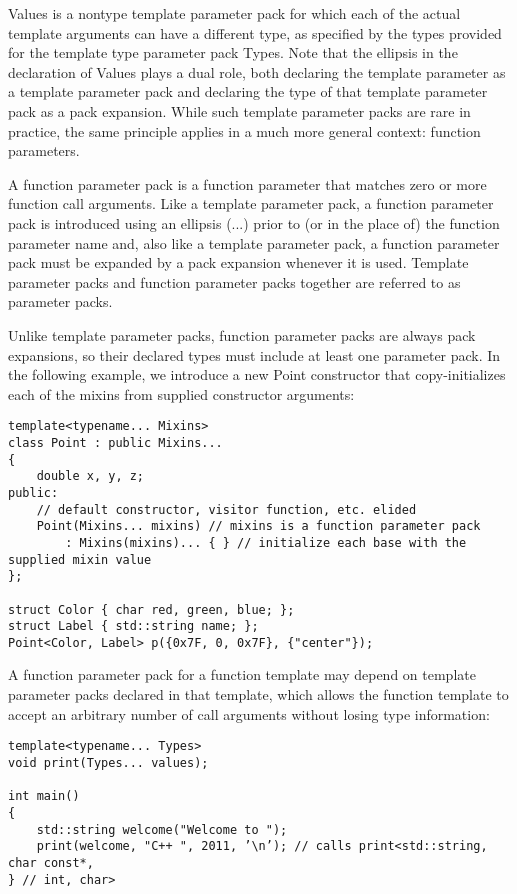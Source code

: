 Values is a nontype template parameter pack for which each of the actual template arguments can have a different type, as specified by the types provided for the template type parameter pack Types. Note that the ellipsis in the declaration of Values plays a dual role, both declaring the template parameter as a template parameter pack and declaring the type of that template parameter pack as a pack expansion. While such template parameter packs are rare in practice, the same principle applies in a much more general context: function parameters.


A function parameter pack is a function parameter that matches zero or more function call arguments. Like a template parameter pack, a function parameter pack is introduced using an ellipsis (...) prior to (or in the place of) the function parameter name and, also like a template parameter pack, a function parameter pack must be expanded by a pack expansion whenever it is used. Template parameter packs and function parameter packs together are referred to as parameter packs.

Unlike template parameter packs, function parameter packs are always pack expansions, so their declared types must include at least one parameter pack. In the following example, we introduce a new Point constructor that copy-initializes each of the mixins from supplied constructor arguments:

\begin{lstlisting}[style=styleCXX]
template<typename... Mixins>
class Point : public Mixins...
{
	double x, y, z;
public:
	// default constructor, visitor function, etc. elided
	Point(Mixins... mixins) // mixins is a function parameter pack
		: Mixins(mixins)... { } // initialize each base with the supplied mixin value
};

struct Color { char red, green, blue; };
struct Label { std::string name; };
Point<Color, Label> p({0x7F, 0, 0x7F}, {"center"});
\end{lstlisting}

A function parameter pack for a function template may depend on template parameter packs declared in that template, which allows the function template to accept an arbitrary number of call arguments without losing type information:

\begin{lstlisting}[style=styleCXX]
template<typename... Types>
void print(Types... values);

int main()
{
	std::string welcome("Welcome to ");
	print(welcome, "C++ ", 2011, ’\n’); // calls print<std::string, char const*,
} // int, char>
\end{lstlisting}

